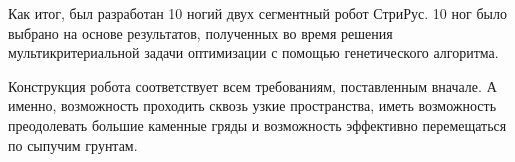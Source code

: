 Как итог, был разработан 10 ногий двух сегментный робот СтриРус. 10 ног было выбрано на основе результатов, полученных во время решения мультикритериальной задачи оптимизации с помощью генетического алгоритма.

Конструкция робота соответствует всем требованиям, поставленным вначале. А именно, возможность проходить сквозь узкие пространства, иметь возможность преодолевать большие каменные гряды и возможность эффективно перемещаться по сыпучим грунтам.


